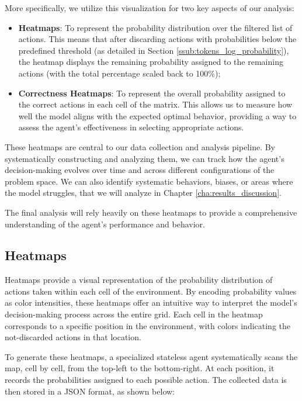 More specifically, we utilize this visualization for two key aspects of our
analysis:

\begin{itemize}
  \item \textbf{Heatmaps}: To represent the probability distribution over the filtered
    list of actions. This means that after discarding actions with probabilities
    below the predefined threshold (as detailed in Section \ref{ssub:tokens_log_probability}),
    the heatmap displays the remaining probability assigned to the remaining actions
    (with the total percentage scaled back to 100\%);

  \item \textbf{Correctness Heatmaps}: To represent the overall probability assigned
    to the correct actions in each cell of the matrix. This allows us to measure
    how well the model aligns with the expected optimal behavior, providing a way
    to assess the agent's effectiveness in selecting appropriate actions.
\end{itemize}

These heatmaps are central to our data collection and analysis pipeline. By
systematically constructing and analyzing them, we can track how the agent's decision-making
evolves over time and across different configurations of the problem space. We
can also identify systematic behaviors, biases, or areas where the model
struggles, that we will analyze in Chapter \ref{cha:results_discussion}.

The final analysis will rely heavily on these heatmaps to provide a comprehensive
understanding of the agent's performance and behavior.

\subsection{Heatmaps}
\label{sub:heatmaps}

Heatmaps provide a visual representation of the probability distribution of
actions taken within each cell of the environment. By encoding probability values
as color intensities, these heatmaps offer an intuitive way to interpret the
model's decision-making process across the entire grid. Each cell in the heatmap
corresponds to a specific position in the environment, with colors indicating
the not-discarded actions in that location.

To generate these heatmaps, a specialized stateless agent systematically scans the
map, cell by cell, from the top-left to the bottom-right. At each position, it records
the probabilities assigned to each possible action. The collected data is then
stored in a JSON format, as shown below:

